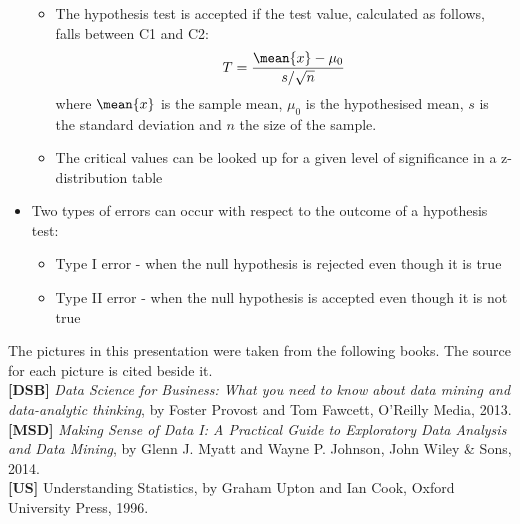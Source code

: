 \begin{itemize}
\begin{itemize}
  \item The hypothesis test is accepted if the test value, calculated as follows, falls between C1 and C2:
    $$ T = \dfrac{\mean{x} - \mu_0}{s/\sqrt{n}}$$
    where $\mean{x}$ is the sample mean, $\mu_0$ is the hypothesised mean, $s$ is the standard deviation and $n$ the size of the sample.
    \item The critical values can be looked up for a given level of significance in a z-distribution table
  \end{itemize}
\item Two types of errors can occur with respect to the outcome of a hypothesis test:
  \begin{itemize}
  \item Type I error - when the null hypothesis is rejected even though it is true
  \item Type II error - when the null hypothesis is accepted even though it is not true
  \end{itemize}
\end{itemize}

\newpage

The pictures in this presentation were taken from the following books. The source for each picture is cited beside it. \\

\textbf{[DSB]} \emph{Data Science for Business: What you need to know about data mining and data-analytic thinking}, by Foster Provost and Tom Fawcett, O'Reilly Media, 2013. \\

\textbf{[MSD]} \emph{Making Sense of Data I: A Practical Guide to Exploratory Data Analysis and Data Mining}, by Glenn J. Myatt and Wayne P. Johnson, John Wiley \& Sons, 2014. \\

\textbf{[US]} Understanding Statistics, by Graham Upton and Ian Cook, Oxford University Press, 1996.



